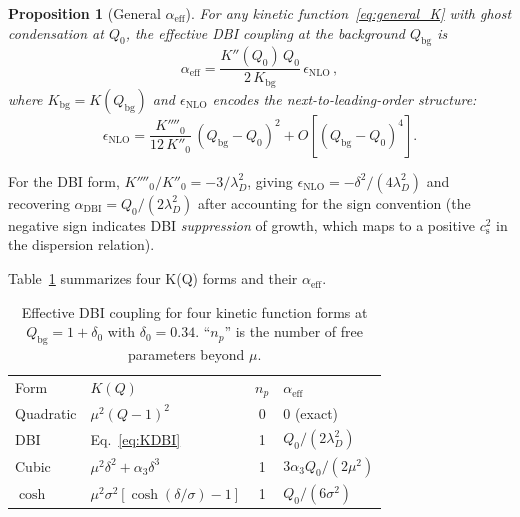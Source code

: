 \documentclass[prd,twocolumn,superscriptaddress,longbibliography,floatfix]{revtex4-2}
\newtheorem{proposition}[theorem]{Proposition}
\newcommand{\cs}{c_{\mathrm{s}}}
\begin{document}
\begin{proposition}[General $\alpha_{\mathrm{eff}}$]
\label{prop:general_alpha}
For any kinetic function~\eqref{eq:general_K}
with ghost condensation at $Q_0$, the effective
DBI coupling at the background $Q_{\mathrm{bg}}$
is
\begin{equation}
\alpha_{\mathrm{eff}} = \frac{K''(Q_0)\,Q_0}
{2\,K_{\mathrm{bg}}}\,\epsilon_{\mathrm{NLO}}\,,
\label{eq:alpha_general}
\end{equation}
where $K_{\mathrm{bg}} = K(Q_{\mathrm{bg}})$ and
$\epsilon_{\mathrm{NLO}}$ encodes the
next-to-leading-order structure:
\begin{equation}
\epsilon_{\mathrm{NLO}} =
\frac{K''''_0}{12\,K''_0}\,(Q_{\mathrm{bg}} - Q_0)^2
+ O\!\left[(Q_{\mathrm{bg}} - Q_0)^4\right].
\label{eq:epsilon_NLO}
\end{equation}
\end{proposition}

For the DBI form, $K''''_0/K''_0 = -3/\lambda_D^2$,
giving $\epsilon_{\mathrm{NLO}}
= -\delta^2/(4\lambda_D^2)$ and recovering
$\alpha_{\mathrm{DBI}} = Q_0/(2\lambda_D^2)$
after accounting for the sign convention
(the negative sign indicates DBI \emph{suppression}
of growth, which maps to a positive $\cs^2$
in the dispersion relation).

Table~\ref{tab:forms} summarizes four
K(Q) forms and their $\alpha_{\mathrm{eff}}$.

\begin{table}[t]
\caption{\label{tab:forms}Effective DBI coupling
for four kinetic function forms at
$Q_{\mathrm{bg}} = 1 + \delta_0$ with
$\delta_0 = 0.34$.  ``$n_p$'' is the number of
free parameters beyond $\mu$.}
\begin{ruledtabular}
\begin{tabular}{llcl}
Form & $K(Q)$ & $n_p$ & $\alpha_{\mathrm{eff}}$ \\
\colrule
Quadratic & $\mu^2(Q{-}1)^2$ & 0 & 0 (exact) \\
DBI & Eq.~\eqref{eq:KDBI} & 1 & $Q_0/(2\lambda_D^2)$ \\
Cubic & $\mu^2\delta^2 + \alpha_3\delta^3$ &
  1 & $3\alpha_3 Q_0/(2\mu^2)$ \\
$\cosh$ & $\mu^2\sigma^2[\cosh(\delta/\sigma){-}1]$ &
  1 & $Q_0/(6\sigma^2)$ \\
\end{tabular}
\end{ruledtabular}
\end{table}


\end{document}
